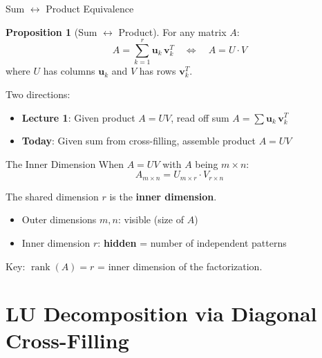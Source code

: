 \documentclass[10pt]{beamer}
\theoremstyle{definition}
\newtheorem{prop}{Proposition}[section]
\newcommand{\x}[1]{\alert{\textbf{#1}}}
\begin{document}
\begin{frame}{Sum $\leftrightarrow$ Product Equivalence}
\begin{prop}[Sum $\leftrightarrow$ Product]
For any matrix $A$:
$$A = \sum_{k=1}^r \mathbf{u}_k\,\mathbf{v}_k^T \quad \Longleftrightarrow \quad A = U \cdot V$$
where $U$ has columns $\mathbf{u}_k$ and $V$ has rows $\mathbf{v}_k^T$.
\end{prop}

\vfill
Two directions:
\begin{itemize}
\item \textbf{Lecture 1}: Given product $A = UV$, read off sum $A = \sum \mathbf{u}_k\,\mathbf{v}_k^T$
\item \textbf{Today}: Given sum from cross-filling, assemble product $A = UV$
\end{itemize}
\end{frame}

\begin{frame}{The Inner Dimension}
When $A = UV$ with $A$ being $m \times n$:
$$A_{m \times n} = U_{m \times \boxed{r}} \cdot V_{\boxed{r} \times n}$$

The shared dimension $r$ is the \x{inner dimension}.

\vfill
\begin{itemize}
\item Outer dimensions $m, n$: visible (size of $A$)
\item Inner dimension $r$: \x{hidden} = number of independent patterns
\end{itemize}

\vfill
Key: $\operatorname{rank}(A) = r$ = inner dimension of the factorization.
\end{frame}

\section{LU Decomposition via Diagonal Cross-Filling}
\end{document}
